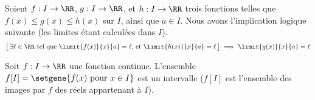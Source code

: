 \begin{fact} \label{lim-cops}
    Soient
    $f: I \to \RR$,
    $g: I \to \RR$,
    et
    $h: I \to \RR$
    trois fonctions telles que
    $f(x) \leq g(x) \leq h(x)$ sur $I$,
    ainsi que
    $a \in I$.
    Nous avons l'implication logique suivante (les limites étant calculées dans $I$).
    \[
        \big[\,
            \text{$\exists \ell \in \RR$ tel que
                  $\limit{f(x)}{x}{a} = \ell$,
                  et
                  $\limit{h(x)}{x}{a} = \ell$}
        \,\big]
        \implies
        \limit{g(x)}{x}{a} = \ell
    \]
\end{fact}




\begin{fact} \label{tvi}
    Soit
    $f: I \to \RR$ une fonction continue.
    L'ensemble $f[I] = \setgene{f(x) \text{ pour } x \in I}$ est un intervalle ($f[I]$ est l'ensemble des images par $f$ des réels appartenant à $I$).
\end{fact}
